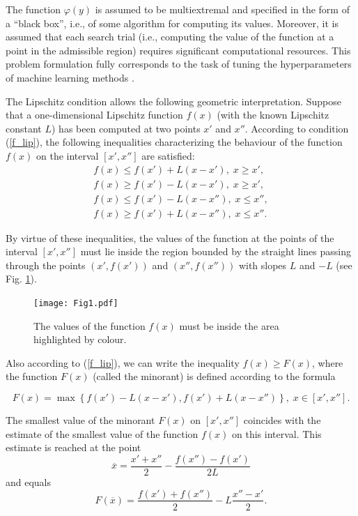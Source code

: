 \documentclass[preprint,12pt]{elsarticle}
\begin{document}
The function $\varphi(y)$ is assumed to be multiextremal and specified in the form of a ``black box'', i.e., of some algorithm for computing its values. Moreover, it is assumed that each search trial (i.e., computing the value of the function at a point in the admissible region) requires significant computational resources. This problem formulation fully corresponds to the task of tuning the hyperparameters of machine learning methods \cite{Joy2020,Wang2021}.


The Lipschitz condition allows the following geometric interpretation. Suppose that a one-dimensional Lipschitz function $f(x)$ (with the known Lipschitz constant $L$) has been computed at two points $x'$ and $x''$. According to condition (\ref{f_lip}), the following inequalities characterizing the behaviour of the function $f(x)$ on the interval $[x', x'']$  are satisfied:
\begin{gather*}
	f(x) \leq f(x') + L(x-x'), \; x \geq x',\\
	f(x) \geq f(x') - L(x-x'), \; x \geq x',\\
	f(x) \leq f(x') - L(x-x''), \; x \leq x'',\\
	f(x) \geq f(x') + L(x-x''), \; x \leq x''.
\end{gather*}

  By virtue of these inequalities, the values of the function at the points of the interval $[x', x'']$ must lie inside the region bounded by the straight lines passing through the points $(x', f(x'))$ and $(x'', f(x''))$ with slopes $L$ and $-L$ (see Fig. \ref{fig1}).

\begin{figure}
\centering
\texttt{[image: Fig1.pdf]}
\caption{The values of the function $f(x)$ must be inside the area highlighted by colour.} \label{fig1}
\end{figure}

Also according to (\ref{f_lip}), we can write the inequality $f(x) \geq F(x)$, where the function  $F(x)$ (called the minorant) is defined according to the formula

\[
F(x) = \max\left\{f(x') - L(x-x'),f(x') + L(x-x'')\right\}, \; x\in [x', x''].
\] 

The smallest value of the minorant $F(x)$ on $[x', x'']$ coincides with the estimate of the smallest value of the function $f(x)$ on this interval. This estimate is reached at the point
\[
\overline{x} = \frac{x'+x''}{2}-\frac{f(x'')-f(x')}{2L}
\] 
and equals
\[
F(\overline{x}) = \frac{f(x')+f(x'')}{2} -L \frac{x''-x'}{2}.
\]
\end{document}
